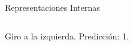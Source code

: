 \documentclass[10pt]{beamer}
\begin{document}

\begin{frame}{Representaciones Internas}
    \begin{columns}
        \begin{column}{0.31\textwidth}
            Giro a la izquierda. Predicción: \alert{1}.
            \begin{figure}[!h] 
                \centering

\end{figure}
\end{column}
\end{columns}
\end{frame}
\end{document}
